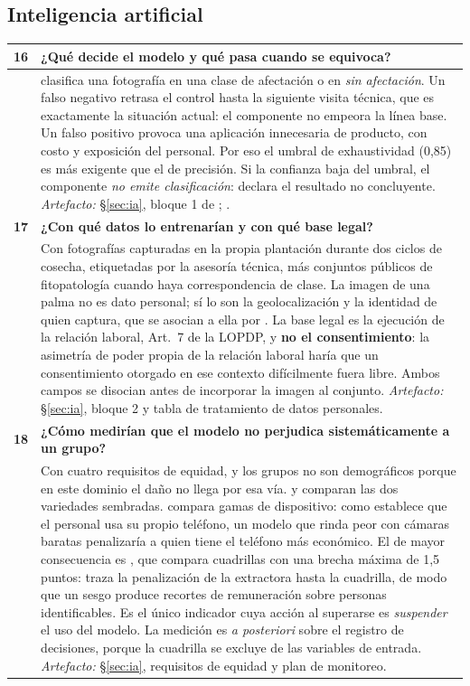 \subsection*{Inteligencia artificial}

\begin{longtable}{|C{0.7cm}|L{14.6cm}|}
\hline
{}\textbf{16} & \textbf{¿Qué decide el modelo y qué pasa cuando se equivoca?}\\ \hline
&  clasifica una fotografía en una clase de afectación o en \emph{sin afectación}. Un falso negativo retrasa el control hasta la siguiente visita técnica, que es exactamente la situación actual: el componente no empeora la línea base. Un falso positivo provoca una aplicación innecesaria de producto, con costo y exposición del personal. Por eso el umbral de exhaustividad (0,85) es más exigente que el de precisión. Si la confianza baja del umbral, el componente \emph{no emite clasificación}: declara el resultado no concluyente. \newline \emph{Artefacto:} \S\ref{sec:ia}, bloque 1 de ; .\\ \hline
{}\textbf{17} & \textbf{¿Con qué datos lo entrenarían y con qué base legal?}\\ \hline
& Con fotografías capturadas en la propia plantación durante dos ciclos de cosecha, etiquetadas por la asesoría técnica, más conjuntos públicos de fitopatología cuando haya correspondencia de clase. La imagen de una palma no es dato personal; sí lo son la geolocalización y la identidad de quien captura, que se asocian a ella por . La base legal es la ejecución de la relación laboral, Art.~7 de la LOPDP, y \textbf{no el consentimiento}: la asimetría de poder propia de la relación laboral haría que un consentimiento otorgado en ese contexto difícilmente fuera libre. Ambos campos se disocian antes de incorporar la imagen al conjunto. \newline \emph{Artefacto:} \S\ref{sec:ia}, bloque 2 y tabla de tratamiento de datos personales.\\ \hline
{}\textbf{18} & \textbf{¿Cómo medirían que el modelo no perjudica sistemáticamente a un grupo?}\\ \hline
& Con cuatro requisitos de equidad, y los grupos no son demográficos porque en este dominio el daño no llega por esa vía.  y  comparan las dos variedades sembradas.  compara gamas de dispositivo: como  establece que el personal usa su propio teléfono, un modelo que rinda peor con cámaras baratas penalizaría a quien tiene el teléfono más económico. El de mayor consecuencia es , que compara cuadrillas con una brecha máxima de 1,5 puntos:  traza la penalización de la extractora hasta la cuadrilla, de modo que un sesgo produce recortes de remuneración sobre personas identificables. Es el único indicador cuya acción al superarse es \emph{suspender} el uso del modelo. La medición es \emph{a posteriori} sobre el registro de decisiones, porque la cuadrilla se excluye de las variables de entrada. \newline \emph{Artefacto:} \S\ref{sec:ia}, requisitos de equidad y plan de monitoreo.\\ \hline

\end{longtable}
